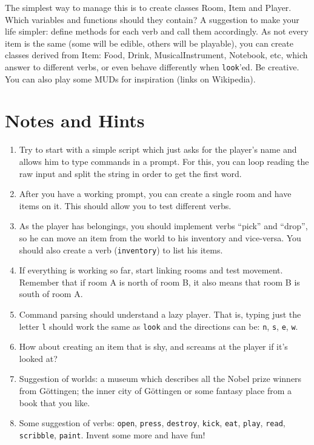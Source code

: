 \documentclass[smallheadings,12pt]{scrartcl}
\newcommand{\cmd}[1]{\texttt{#1}}
\begin{document}
The simplest way to manage this is to create classes Room, Item and Player. Which variables and
functions should they contain? A suggestion to make your life simpler: define methods for each verb
and call them accordingly. As not every item is the same (some will be edible, others will be playable),
you can create classes derived from Item: Food, Drink, MusicalInstrument, Notebook, etc, which answer to
different verbs, or even behave differently when \cmd{look}'ed. Be creative. You can also play some MUDs
for inspiration (links on Wikipedia).  


\section*{Notes and Hints}
 \begin{enumerate}
 \item Try to start with a simple script which just asks for
 the player's name and allows him to type commands in a prompt. For this, you can loop reading the raw 
 input and split the string in order to get the first word.
 
 \item After you have a working prompt, you can create a single room and have items on it.
 This should allow you to test different verbs.
 
  \item As the player has belongings, you should implement verbs ``pick'' and ``drop'',
  so he can move an item from the world to his inventory and vice-versa. You should also
  create a verb (\cmd{inventory}) to list his items.
 
 \item If everything is working so far, start linking rooms and test movement. Remember that
 if room A is north of room B, it also means that room B is south of room A.
 
 \item Command parsing should understand a lazy player. That is, typing just the letter \cmd{l} should work
 the same as \cmd{look} and the directions can be: \cmd{n}, \cmd{s}, \cmd{e}, \cmd{w}.  
 
 \item How about creating an item that is shy, and screams at the player if it's looked at?
 
 \item Suggestion of worlds: a museum which describes all the Nobel prize winners
 from G\"ottingen; the inner city of G\"ottingen or some fantasy place from a book that you like.
 
 \item Some suggestion of verbs: \cmd{open}, \cmd{press}, \cmd{destroy}, \cmd{kick},
 \cmd{eat}, \cmd{play}, \cmd{read}, \cmd{scribble}, \cmd{paint}. Invent some more and have fun!
 
  \end{enumerate}
 
 
\end{document}
